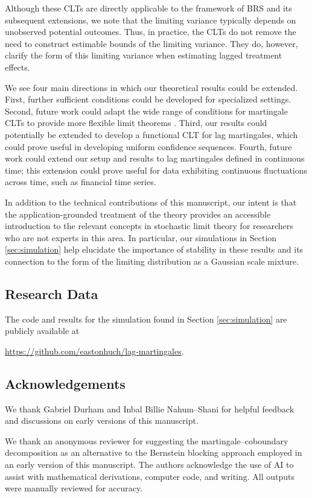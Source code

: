\documentclass[11pt]{article}
\newif\ifanonymous
\newcommand{\refitem}[1]{$\mathrm{(}$\hyperlink{cond:#1}{\csname cond#1\endcsname}$\mathrm{)}$}
\theoremstyle{definition}
\begin{document}
Although these CLTs are directly applicable to the framework of BRS and its subsequent extensions, we note that the limiting variance typically depends on unobserved potential outcomes.
Thus, in practice, the CLTs do not remove the need to construct estimable bounds of the limiting variance.
They do, however, clarify the form of this limiting variance when estimating lagged treatment effects.

We see four main directions in which our theoretical results could be extended.
First, further sufficient conditions could be developed for specialized settings.
Second, future work could adapt the wide range of conditions for martingale CLTs to provide more flexible limit theorems \citep{hausler_stable_2015,hausler_stable_2024}.
Third, our results could potentially be extended to develop a functional CLT for lag martingales, which could prove useful in developing uniform confidence sequences.
Fourth, future work could extend our setup and results to lag martingales defined in continuous time; this extension could prove useful for data exhibiting continuous fluctuations across time, such as financial time series.

In addition to the technical contributions of this manuscript, our intent is that the application-grounded treatment of the theory provides an accessible introduction to the relevant concepts in stochastic limit theory for researchers who are not experts in this area.
In particular, our simulations in Section \ref{sec:simulation} help elucidate the importance of stability in these results and its connection to the form of the limiting distribution as a Gaussian scale mixture.

\subsection*{Research Data}
The code and results for the simulation found in Section \ref{sec:simulation} are publicly available at 
\ifanonymous
\url{https://github.com/redacted/for/anonymous/peer/review}.
\else
\url{https://github.com/eastonhuch/lag-martingales}.
\fi

\subsection*{Acknowledgements}
\ifanonymous
\else
We thank Gabriel Durham and Inbal Billie Nahum--Shani for helpful feedback and discussions on early versions of this manuscript.
\fi
We thank an anonymous reviewer for suggesting the martingale--coboundary decomposition as an alternative to the Bernstein blocking approach employed in an early version of this manuscript.
The authors acknowledge the use of AI to assist with mathematical derivations, computer code, and writing.
All outputs were manually reviewed for accuracy.
\end{document}
